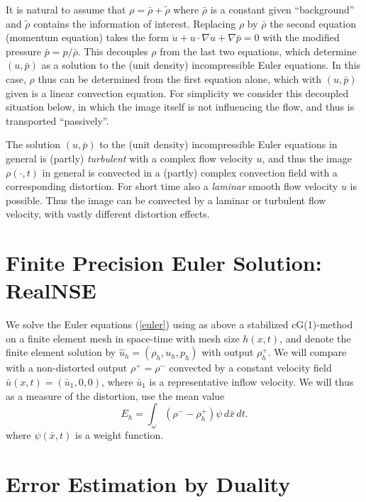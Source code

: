 It is natural to assume that $\rho =\bar\rho +\tilde\rho$ 
where $\bar\rho$ is a constant given ``background'' and $\tilde\rho$
contains the information of interest. 
Replacing $\rho$ by $\bar\rho$ the second equation (momentum equation)
takes the form 
$\dot u+u\cdot\nabla u +\nabla\bar p=0$ with the modified pressure
$\bar p=p/\bar\rho$. This decouples $\rho$ from the last two equations,
which determine $(u,\bar p)$ as a solution to the (unit density)
incompressible Euler equations. In this case, $\rho $ thus can be 
determined from the first equation alone, which with $(u,\bar p)$ given 
is a linear convection equation.
For simplicity we consider this decoupled situation below, in which
the image itself is not influencing the flow, and thus is 
transported ``passively''.

The solution $(u,\bar p)$ to the (unit density) incompressible Euler 
equations in general is (partly) \emph{turbulent} with a complex 
flow velocity $u$, and thus the image 
$\rho (\cdot ,t)$ in general is convected in a (partly) complex 
convection field with a corresponding distortion. 
For short time also a \emph{laminar}
smooth flow velocity $u$ is possible. Thus the image can be
convected by a laminar or turbulent flow velocity, with vastly different
distortion effects. 

\section{Finite Precision Euler Solution: RealNSE}

We solve the Euler equations (\ref{euler}) using 
as above a stabilized cG(1)-method
on a finite element mesh in space-time
with mesh size $h(x,t)$, and denote the finite element solution  
by $\hat u_h=(\rho_h,u_h,p_h)$ with output $\rho_h^+$.
We will compare with a non-distorted output $\rho^+=\rho^-$
convected by a constant velocity field $\bar u(x,t)=(\bar u_1,0,0)$, 
where $\bar u_1$ is a representative inflow velocity. We will 
thus as a measure of the distortion, use the mean value 
\begin{equation}\label{E}
E_h=\int_\omega (\rho^--\rho_h^+)\psi \, d\bar x\, dt.
\end{equation}
where $\psi (\bar x,t)$ is a weight function. 



    


\section{Error Estimation by Duality}

